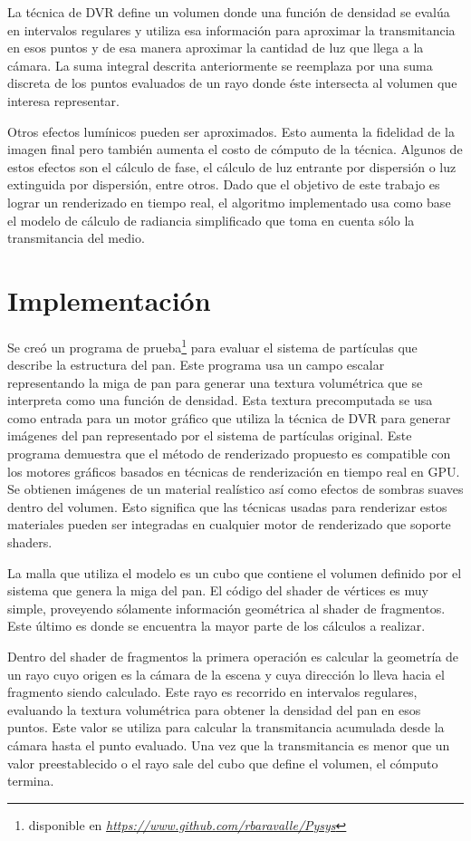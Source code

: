 La técnica de DVR define un volumen donde una función de densidad se evalúa en intervalos regulares y utiliza esa información para aproximar la transmitancia en esos puntos y de esa manera aproximar la cantidad de luz que llega a la cámara. La suma integral descrita anteriormente se reemplaza por una suma discreta de los puntos evaluados de un rayo donde \'este intersecta al volumen que interesa representar. 

Otros efectos lumínicos pueden ser aproximados. Esto aumenta la fidelidad de la imagen final pero también aumenta el costo de cómputo de la técnica. Algunos de estos efectos son el cálculo de fase, el c\'alculo de luz entrante por dispersión o luz extinguida por dispersión, entre otros. Dado que el objetivo de este trabajo es lograr un renderizado en tiempo real, el algoritmo implementado usa como base el modelo de cálculo de radiancia simplificado que toma en cuenta sólo la
transmitancia del medio.

\section{Implementación}
Se cre\'o un programa de prueba\footnote{disponible en \emph{\url{https://www.github.com/rbaravalle/Pysys}}} para evaluar el sistema de partículas que describe la estructura del pan. Este programa usa un campo escalar representando la miga de pan para generar una textura volumétrica que se interpreta como una función de densidad. Esta textura precomputada se usa como entrada para un motor gráfico que utiliza la técnica de DVR para generar imágenes del pan representado por el sistema de partículas original. Este programa demuestra que el método de renderizado propuesto es compatible con los motores gráficos basados en técnicas de renderización en tiempo real en GPU. Se obtienen imágenes de un material realístico así como efectos de sombras suaves dentro del volumen. Esto significa que las técnicas usadas para renderizar estos materiales pueden ser integradas en cualquier motor de renderizado que soporte shaders.

La malla que utiliza el modelo es un cubo que contiene el volumen definido por el sistema que genera la miga del pan. El código del shader de vértices es muy simple, proveyendo sólamente información geométrica al shader de fragmentos. Este último es donde se encuentra la mayor parte de los cálculos a realizar.

Dentro del shader de fragmentos la primera operaci\'on es calcular la geometría de un rayo cuyo origen es la cámara de la escena y cuya dirección lo lleva hacia el fragmento siendo calculado. Este rayo es recorrido en intervalos regulares, evaluando la textura volumétrica para obtener la densidad del pan en esos puntos. Este valor se utiliza para calcular la transmitancia acumulada desde la cámara hasta el punto evaluado. Una vez que la transmitancia es menor que un valor preestablecido o el rayo sale del cubo que define el volumen, el cómputo termina.

